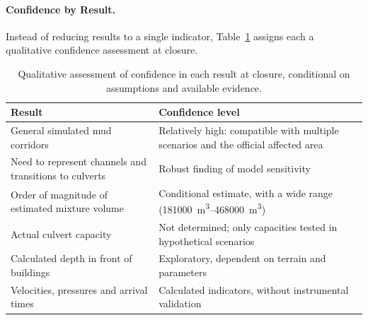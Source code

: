 \paragraph{Confidence by Result.} Instead of reducing results to a single indicator, Table~\ref{tab:confianza} assigns each a qualitative confidence assessment at closure.
\begin{table}[htbp]\centering\small
\caption{Qualitative assessment of confidence in each result at closure, conditional on assumptions and available evidence.}\label{tab:confianza}
\begin{tabular}{p{}p{}}\toprule
Result & Confidence level\\\midrule
General simulated mud corridors & Relatively high: compatible with multiple scenarios and the official affected area\\
Need to represent channels and transitions to culverts & Robust finding of model sensitivity\\
Order of magnitude of estimated mixture volume & Conditional estimate, with a wide range (\SIrange{181000}{468000}{m^3})\\
Actual culvert capacity & Not determined; only capacities tested in hypothetical scenarios\\
Calculated depth in front of buildings & Exploratory, dependent on terrain and parameters\\
Velocities, pressures and arrival times & Calculated indicators, without instrumental validation\\
\bottomrule\end{tabular}
\end{table}
